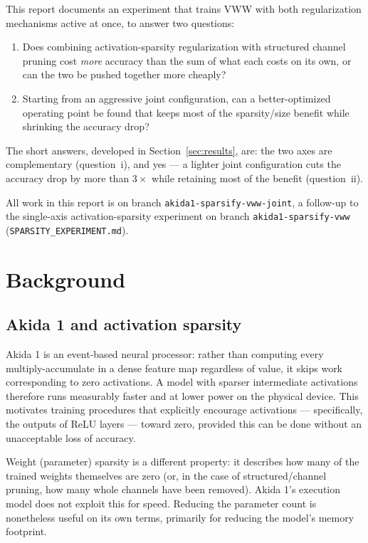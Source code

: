 \documentclass[11pt]{article}
\newcommand{\code}[1]{\texttt{#1}}
\begin{document}
This report documents an experiment that trains VWW with both regularization mechanisms active at once, to answer two questions:

\begin{enumerate}[label=(\roman*)]
    \item Does combining activation-sparsity regularization with structured channel pruning cost \emph{more} accuracy than the sum of what each costs on its own, or can the two be pushed together more cheaply?
    \item Starting from an aggressive joint configuration, can a better-optimized operating point be found that keeps most of the sparsity/size benefit while shrinking the accuracy drop?
\end{enumerate}

The short answers, developed in Section~\ref{sec:results}, are: the two axes are complementary (question~i), and yes --- a lighter joint configuration cuts the accuracy drop by more than $3\times$ while retaining most of the benefit (question~ii).

All work in this report is on branch \code{akida1-sparsify-vww-joint}, a follow-up to the single-axis activation-sparsity experiment on branch \code{akida1-sparsify-vww} (\code{SPARSITY\_EXPERIMENT.md}).

\section{Background}

\subsection{Akida 1 and activation sparsity}

Akida 1 is an event-based neural processor: rather than computing every multiply-accumulate in a dense feature map regardless of value, it skips work corresponding to zero activations. A model with sparser intermediate activations therefore runs measurably faster and at lower power on the physical device. This motivates training procedures that explicitly encourage activations --- specifically, the outputs of ReLU layers --- toward zero, provided this can be done without an unacceptable loss of accuracy.

Weight (parameter) sparsity is a different property: it describes how many of the trained weights themselves are zero (or, in the case of structured/channel pruning, how many whole channels have been removed). Akida 1's execution model does not exploit this for speed. Reducing the parameter count is nonetheless useful on its own terms, primarily for reducing the model's memory footprint.
\end{document}
